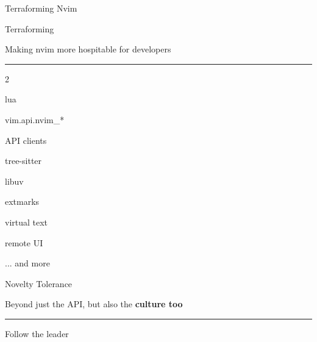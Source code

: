 \documentclass{beamer}
\begin{document}
\begin{frame}{Terraforming Nvim}
	
	\begin{block}{Terraforming}

		\vspace{0.5em}

		Making nvim more hospitable for developers

		\vspace{0.5em}

	\end{block}

	\rule{\textwidth}{0.1em}

	\begin{itemize}


	\end{itemize}

	... and more 

\end{frame}


\begin{frame}{Novelty Tolerance}

	Beyond just the API, but also the \textbf{culture too}

	\rule{\textwidth}{0.1em}

	Follow the leader

\end{frame}
\end{document}
